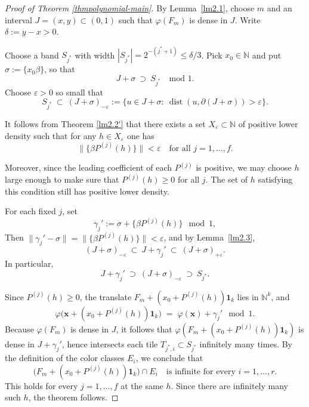 \documentclass[10pt,a4paper]{amsart}
\newcommand{\dist}{\operatorname{dist}}
\begin{document}
\begin{proof}[Proof of Theorem \ref{thmpolynomial-main}]
By Lemma~\ref{lm2.1}, choose $m$ and an interval $J=(x,y)\subset(0,1)$ such that $\varphi(F_m)$ is dense in $J$.
Write $\delta:=y-x>0$.

Choose a band $S_{j^\ast}$ with width $|S_{j^\ast}|=2^{-(j^\ast+1)}\le \delta/3$.
Pick $x_0\in\mathbb N$ and put $\sigma:=\{x_0\beta\}$, so that
\[
  J+\sigma\ \supset\ S_{j^\ast}\quad\text{mod }1.
\]
Choose $\varepsilon>0$ so small that
\[
  S_{j^\ast}\ \subset\ (J+\sigma)_{-\varepsilon}
  :=\{u\in J+\sigma:\ \dist(u,\partial(J+\sigma))>\varepsilon\}.
\]

It follows from Theorem \ref{lm2.2'} that there exists a set $X_{\varepsilon}\subset \mathbb{N}$ of positive lower density such that for any $h\in X_{\varepsilon}$ one has
\[
  \|\{\beta P^{(j)}(h)\}\|<\varepsilon \quad\text{for all } j=1,\dots,f.
\]

Moreover, since the leading coefficient of each $P^{(j)}$ is positive,
we may choose $h$ large enough to make sure that $P^{(j)}(h)\ge 0$ for all $j$. The set of $h$ satisfying this condition still has positive lower density.

For each fixed $j$, set
\[
  \gamma_j':=\sigma+ \{\beta P^{(j)}(h)\}\mod 1,
\]
Then $\|\gamma_j'-\sigma\|=\|\{\beta P^{(j)}(h)\}\|<\varepsilon$, and by Lemma~\ref{lm2.3},
\[
  (J+\sigma)_{-\varepsilon}\ \subset\ J+\gamma_j'\ \subset\ (J+\sigma)_{+\varepsilon}.
\]
In particular,
\[
  J+\gamma_j'\ \supset\ (J+\sigma)_{-\varepsilon}\ \supset\ S_{j^\ast}.
\]

Since $P^{(j)}(h)\ge 0$, the translate $F_m+(x_0+P^{(j)}(h))\mathbf{1}_k$ lies in $\mathbb N^k$, and
\[
  \varphi\!\big(\mathbf{x}+(x_0+P^{(j)}(h))\mathbf{1}_k\big)
  \;=\;\varphi(\mathbf{x})+\gamma_j' \mod 1.
\]
Because $\varphi(F_m)$ is dense in $J$, it follows that $\varphi(F_m+(x_0+P^{(j)}(h))\mathbf{1}_k)$
is dense in $J+\gamma_j'$, hence intersects each tile $T_{j^\ast,i}\subset S_{j^\ast}$ infinitely many times.
By the definition of the color classes $E_i$, we conclude that
\[
  \big(F_m+(x_0+P^{(j)}(h))\mathbf{1}_k\big)\cap E_i
  \quad\text{is infinite for every } i=1,\dots,r.
\]
This holds for every $j=1,\dots,f$ at the same $h$.
Since there are infinitely many such $h$,
the theorem follows. \end{proof}
\end{document}
